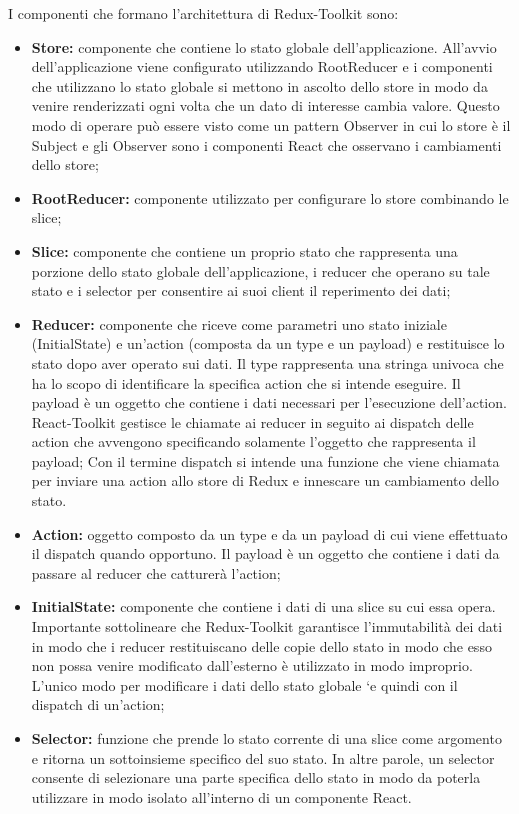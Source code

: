 I componenti che formano l’architettura di Redux-Toolkit sono:
\begin{itemize}
    \item \textbf{Store:} componente che contiene lo stato globale dell’applicazione.
    All’avvio dell’applicazione viene configurato utilizzando RootReducer e i componenti che utilizzano
    lo stato globale si mettono in ascolto dello store in modo da venire renderizzati ogni volta che un dato
    di interesse cambia valore. Questo modo di operare può essere visto come un pattern Observer in
    cui lo store è il Subject e gli Observer sono i componenti React che osservano i cambiamenti dello store;
    \item \textbf{RootReducer:} componente utilizzato per configurare lo store combinando le slice;
    \item \textbf{Slice:} componente che contiene un proprio stato che rappresenta una porzione dello stato globale
    dell’applicazione, i reducer che operano su tale stato e i selector per consentire ai suoi client il
    reperimento dei dati;
    \item \textbf{Reducer:} componente che riceve come parametri uno stato iniziale (InitialState) e un'action
    (composta da un type e un payload) e restituisce lo stato dopo aver operato sui dati. 
    Il type rappresenta una stringa univoca che ha lo scopo di identificare la specifica action che si intende eseguire.
    Il payload è un oggetto che contiene i dati necessari per l'esecuzione dell'action.
    React-Toolkit gestisce le chiamate ai reducer in seguito ai dispatch delle action che avvengono
    specificando solamente l’oggetto che rappresenta il payload;
    Con il termine dispatch si intende una funzione che viene chiamata per inviare una action allo store di Redux e innescare un cambiamento dello stato.
    \item \textbf{Action:} oggetto composto da un type e da un payload di cui viene effettuato il dispatch quando
    opportuno. Il payload è un oggetto che contiene i dati da passare al reducer che catturerà l’action;
    \item \textbf{InitialState:} componente che contiene i dati di una slice su cui essa opera.
    Importante sottolineare che Redux-Toolkit garantisce l’immutabilità dei dati in modo che i reducer restituiscano delle copie dello stato in modo che esso non possa venire
    modificato dall’esterno è utilizzato in modo improprio.
    L’unico modo per modificare i dati dello stato globale `e quindi con il dispatch di un’action;
    \item \textbf{Selector:} funzione che prende lo stato corrente di una slice come argomento e ritorna un sottoinsieme
    specifico del suo stato. In altre parole, un selector consente di selezionare una parte specifica
    dello stato in modo da poterla utilizzare in modo isolato all’interno di un componente React.
\end{itemize}

